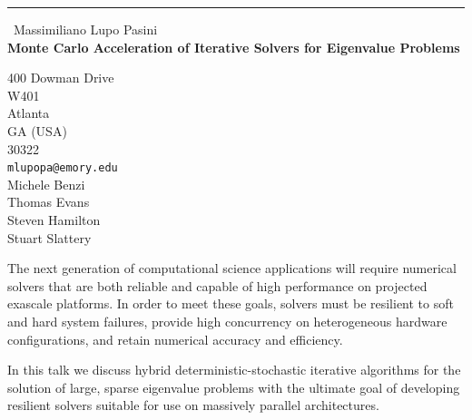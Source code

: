 \documentclass{report}
\begin{document}
\begin{center}
\rule{6in}{1pt} \
{\large Massimiliano Lupo Pasini \\
{\bf Monte Carlo Acceleration of Iterative Solvers for Eigenvalue Problems}}

400 Dowman Drive \\ W401 \\ Atlanta \\ GA (USA) \\ 30322
\\
{\tt mlupopa@emory.edu}\\
Michele Benzi\\
Thomas Evans\\
Steven Hamilton\\
Stuart Slattery\end{center}

The next generation of computational science applications will require numerical
solvers that are both reliable and capable of high performance on projected exascale
platforms. In order to meet these goals, solvers must be resilient to soft and hard
system failures, provide high concurrency on heterogeneous hardware configurations,
and retain numerical accuracy and efficiency.

In this talk we discuss hybrid deterministic-stochastic iterative
algorithms for the solution
of large, sparse eigenvalue problems with the ultimate goal of developing
resilient solvers suitable for use on massively parallel architectures.
\end{document}
